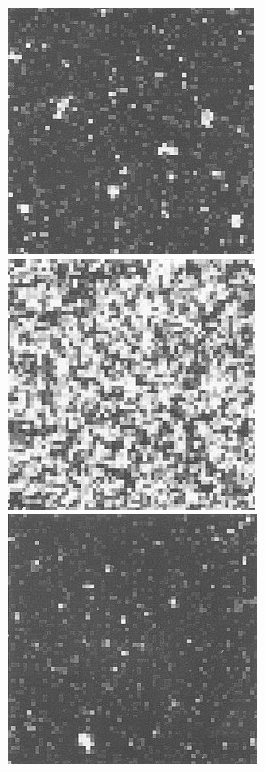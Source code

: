 \documentclass[
  letterpaper,
  enabledeprecatedfontcommands]{report}
\begin{document}
\begin{figure}
\begin{minipage}{0.50\linewidth}
\end{minipage}%
%
\begin{minipage}{0.50\linewidth}

\includegraphics[width=0.5\linewidth,height=\textheight,keepaspectratio]{phase-transitions/Figs/b2_2state.png}

\end{minipage}%
\newline
\begin{minipage}{0.50\linewidth}

\includegraphics[width=0.5\linewidth,height=\textheight,keepaspectratio]{phase-transitions/Figs/a3_2state.png}

\end{minipage}%
%
\begin{minipage}{0.50\linewidth}

\includegraphics[width=0.5\linewidth,height=\textheight,keepaspectratio]{phase-transitions/Figs/b3_2state.png}


\end{minipage}
\end{figure}
\end{document}

